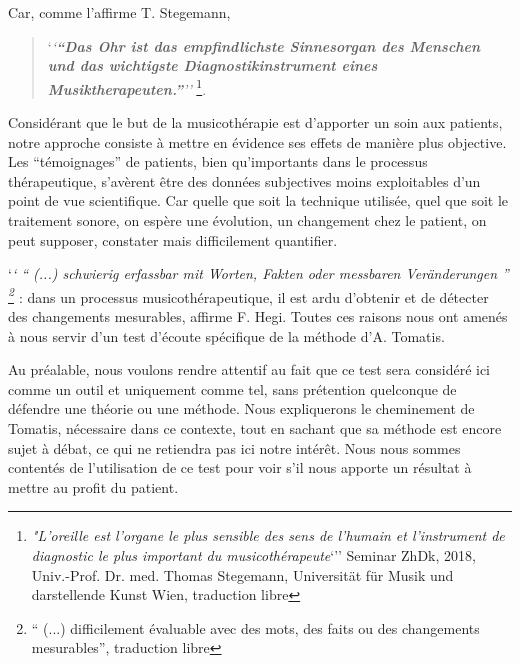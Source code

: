 Car, comme l'affirme T. Stegemann,

\begin{quotation}
	
	`\textit{`\textbf{``Das Ohr ist das empfindlichste
    Sinnesorgan des Menschen und das wichtigste Diagnostikinstrument
    eines Musiktherapeuten.''}''\autocite [44]{seminar_zuerich}}
\footnote{ \textit{"L'oreille est l'organe le plus sensible des sens de l'humain
et l'instrument de diagnostic  le plus important du
musicothérapeute}`'' Seminar  ZhDk, 2018,
Univ.-Prof. Dr. med. Thomas Stegemann, Universität für Musik und darstellende Kunst Wien, traduction libre}.
 \end{quotation}


Considérant que le but de la musicothérapie est d'apporter un soin aux patients,
notre  approche consiste à mettre en évidence ses effets de manière
plus objective. Les ``témoignages'' de patients, bien qu'importants dans le processus thérapeutique,
s'avèrent être des données subjectives moins exploitables d'un
point de vue scientifique. %
Car quelle que soit la technique utilisée, quel que soit
le traitement sonore, on espère une évolution, un changement chez le patient, on peut supposer, constater
 mais
 difficilement quantifier.
 
 `\textit{` \enquote{ (...) schwierig erfassbar mit Worten, Fakten oder messbaren 
 Veränderungen } \footnote { \enquote{ (...) difficilement évaluable avec des mots, des faits ou des 
 changements  
 	mesurables}, traduction libre} \autocite[175]{hegi_improvisation_1993}} : dans un processus 
 	musicothérapeutique, il  
 est ardu d'obtenir et de détecter  des changements mesurables, 
  affirme F. Hegi.
 Toutes ces raisons nous ont amenés à nous servir d'un test d'écoute
 spécifique de la méthode d'A. Tomatis.
 
  Au préalable, nous voulons rendre attentif au fait que ce test sera considéré ici 
 comme un outil et uniquement comme tel, sans prétention quelconque de défendre une théorie ou une 
 méthode. Nous expliquerons le cheminement de Tomatis, nécessaire dans ce contexte, tout en  sachant 
 que sa méthode  est 
 encore sujet à débat, ce qui ne retiendra pas ici notre intérêt. Nous nous sommes contentés de 
 l'utilisation de ce test pour voir s'il nous apporte un résultat à mettre 
 au profit du patient.
 
